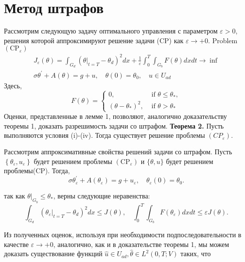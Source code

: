     \section{Метод штрафов}
    Рассмотрим следующую задачу оптимального управления с параметром $\varepsilon>0$,
    решения которой аппроксимируют решение задачи (CP) как $\varepsilon \rightarrow+0$.
    Problem $\left(\mathrm{CP}_{\varepsilon}\right)$
    \[
        \begin{gathered}
            J_{\varepsilon}(\theta)=\int_{G_{d}}\left(\left.\theta\right|_{t=T}-\theta_{d}\right)^{2} d x+\frac{1}{\varepsilon} \int_{0}^{T} \int_{G_{b}} F(\theta) d x d t \rightarrow \inf \\
            \sigma \theta^{\prime}+A(\theta)=g+u, \quad \theta(0)=\theta_{0}, \quad u \in U_{a d}
        \end{gathered}
    \]
    Здесь,
    \[
        F(\theta)=
        \begin{cases}
            0, & \text { if } \theta \leq \theta_{*}, \\
            \left(\theta-\theta_{*}\right)^{2}, & \text { if } \theta>\theta_{*}
        \end{cases}
    \]
    Оценки, представленные в лемме 1, позволяют, аналогично доказательству теоремы 1, доказать разрешимость задачи со штрафом.
    \textbf{Теорема 2.} Пусть выполняются условия (i)-(iv).
    Тогда существует решение проблемы $\left(C P_{\varepsilon}\right)$.

    Рассмотрим аппроксимативные свойства решений задачи со штрафом.
    Пусть $\left\{\theta_{\varepsilon}, u_{\varepsilon}\right\}$ будет решением проблемы
    $\left(\mathrm{CP}_{\varepsilon}\right)$ и $\{\theta, u\}$ будет решением проблемы(CP).
    Тогда,
    \[
        \sigma \theta_{\varepsilon}^{\prime}+A\left(\theta_{\varepsilon}\right)=g+u_{\varepsilon},
        \quad \theta_{\varepsilon}(0)=\theta_{0}.
    \]

    так как $\left.\theta\right|_{G_{b}} \leq \theta_{*}$, верны следующие неравенства:
    \[
        \int_{G_{d}}\left(\left.\theta_{\varepsilon}\right|_{t=T}-\theta_{d}\right)^{2} d x \leq J(\theta),
        \quad \int_{0}^{T} \int_{G_{b}} F\left(\theta_{\varepsilon}\right) d x d t \leq \varepsilon J(\theta).
    \]

    Из полученных оценок, используя при необходимости подпоследовательности в качестве
    $\varepsilon \rightarrow+0$, аналогично, как и в доказательстве теоремы 1, мы можем доказать существование функций
    $\widehat{u} \in U_{a d}, \widehat{\theta} \in L^{2}(0, T ; V)$ таких, что

